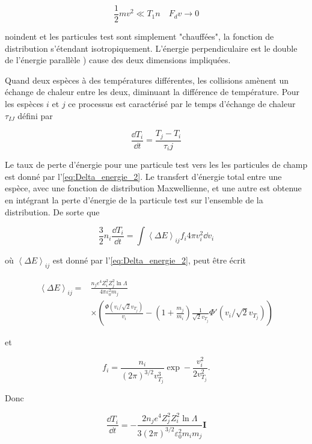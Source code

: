 \documentclass[main.tex]{subfiles}
\begin{document}
\[
	\frac{1}{2} m v^2 \ll T_1n \quad F_d v \rightarrow 0
\]

noindent et les particules test sont simplement "chauffées", la fonction de distribution s'étendant isotropiquement.
L'énergie perpendiculaire est le double de l'énergie parallèle ) cause des deux dimensions impliquées.

Quand deux espèces à des températures différentes, les collisions amènent un échange de chaleur entre les deux, diminuant la différence de température.
Pour les espèces \( i \) et \( j \) ce processus est caractérisé par le temps d'échange de chaleur \( \tau_{IJ} \) défini par

\begin{equation}
	\frac{\dd T_i}{\dd t} = \frac{T_j - T_i}{\tau_ij}
	\label{eq:temps_échange_chaleur}
\end{equation}

\noindent Le taux de perte d'énergie pour une particule test vers les  les particules de champ est donné par l'\autoref{eq:Delta_energie_2}.
Le transfert d'énergie total entre une espèce, avec une fonction de distribution Maxwellienne, et une autre est obtenue en intégrant la perte d'énergie de la particule test sur l'ensemble de la distribution.
De sorte que

\[
	\frac{3}{2} n_i \frac{\dd T_i}{\dd t} = \int \left\langle \Delta E \right\rangle_{ij} f_i 4 \pi v_i^2 \dd v_i
\]

\noindent où \( \left\langle \Delta E \right\rangle_{ij} \) est donné par l'\autoref{eq:Delta_energie_2}, peut être écrit

\begin{align*}
	\left\langle \Delta E \right\rangle_{ij} = &\frac{n_j e^4 Z_i^2 Z_j^2 \ln \Lambda}{4 \pi \varepsilon_0^2 m_j}\\
	& \times \left( \frac{\Phi \left( v_i / \sqrt{2} v_{T_j} \right)}{v_i} - \left( 1 + \frac{m_j}{m_i} \right) \frac{1}{\sqrt{2} v_{T_j}} \Phi'\left( v_i / \sqrt{2} v_{T_j} \right) \right) 
\end{align*}

\noindent et

\[
	f_i = \frac{n_i}{\left(2\pi \right)^{3/2} v_{T_j}^3} \exp - \frac{v_i^2}{2 v_{T_j}^2}.
\]

\noindent Donc

\begin{equation}
	\frac{\dd T_i}{\dd t} = -\frac{2 n_j e^4Z_j^2 Z_i^2 \ln \Lambda}{3 \left(2\pi \right)^{3/2} \varepsilon_0^2 m_im_j} \bm{I}
	\label{eq:d_T1_dt}
\end{equation}
\end{document}
